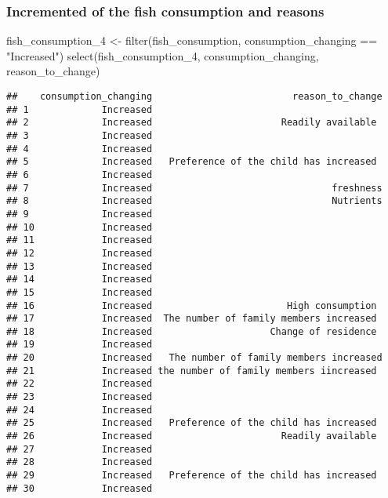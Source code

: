 \documentclass[
]{article}
\newenvironment{Shaded}{\begin{snugshade}}{\end{snugshade}}
\newcommand{\FunctionTok}[1]{\textcolor[rgb]{0.00,0.00,0.00}{#1}}
\newcommand{\NormalTok}[1]{#1}
\newcommand{\OtherTok}[1]{\textcolor[rgb]{0.56,0.35,0.01}{#1}}
\newcommand{\SpecialCharTok}[1]{\textcolor[rgb]{0.00,0.00,0.00}{#1}}
\newcommand{\StringTok}[1]{\textcolor[rgb]{0.31,0.60,0.02}{#1}}
\begin{document}
\hypertarget{incremented-of-the-fish-consumption-and-reasons}{%
\subsubsection{Incremented of the fish consumption and
reasons}\label{incremented-of-the-fish-consumption-and-reasons}}

\begin{Shaded}
\begin{Highlighting}[]
\NormalTok{fish\_consumption\_4 }\OtherTok{\textless{}{-}} \FunctionTok{filter}\NormalTok{(fish\_consumption, consumption\_changing }\SpecialCharTok{==} \StringTok{"Increased"}\NormalTok{)}
                         \FunctionTok{select}\NormalTok{(fish\_consumption\_4, consumption\_changing, reason\_to\_change)}
\end{Highlighting}
\end{Shaded}

\begin{verbatim}
##    consumption_changing                         reason_to_change
## 1             Increased                                         
## 2             Increased                       Readily available 
## 3             Increased                                         
## 4             Increased                                         
## 5             Increased   Preference of the child has increased 
## 6             Increased                                         
## 7             Increased                                freshness
## 8             Increased                                Nutrients
## 9             Increased                                         
## 10            Increased                                         
## 11            Increased                                         
## 12            Increased                                         
## 13            Increased                                         
## 14            Increased                                         
## 15            Increased                                         
## 16            Increased                        High consumption 
## 17            Increased  The number of family members increased 
## 18            Increased                     Change of residence 
## 19            Increased                                         
## 20            Increased   The number of family members increased
## 21            Increased the number of family members iincreased 
## 22            Increased                                         
## 23            Increased                                         
## 24            Increased                                         
## 25            Increased   Preference of the child has increased 
## 26            Increased                       Readily available 
## 27            Increased                                         
## 28            Increased                                         
## 29            Increased   Preference of the child has increased 
## 30            Increased
\end{verbatim}
\end{document}
